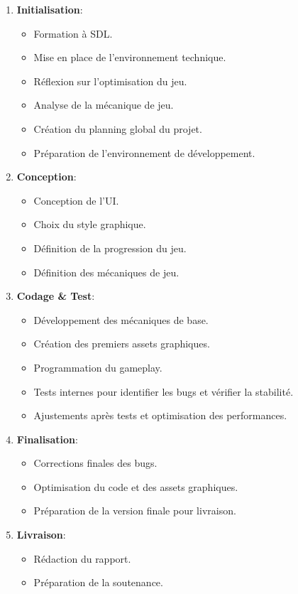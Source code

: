 \documentclass[11pt,a4paper]{article}
\begin{document}
\begin{enumerate}
    \item \textbf{Initialisation}: 
    \begin{itemize}
        \item Formation à SDL.
        \item Mise en place de l'environnement technique.
        \item Réflexion sur l'optimisation du jeu.
        \item Analyse de la mécanique de jeu.
        \item Création du planning global du projet.
        \item Préparation de l’environnement de développement.
    \end{itemize}
    \item \textbf{Conception}: 
    \begin{itemize}
        \item Conception de l'UI.
        \item Choix du style graphique.
        \item Définition de la progression du jeu.
        \item Définition des mécaniques de jeu.
    \end{itemize}
    \item \textbf{Codage \& Test}:
    \begin{itemize}
        \item Développement des mécaniques de base.
        \item Création des premiers assets graphiques.
        \item Programmation du gameplay.
        \item Tests internes pour identifier les bugs et vérifier la stabilité.
        \item Ajustements après tests et optimisation des performances.
    \end{itemize}
    \item \textbf{Finalisation}: 
    \begin{itemize}
        \item Corrections finales des bugs.
        \item Optimisation du code et des assets graphiques.
        \item Préparation de la version finale pour livraison.
    \end{itemize}
    \item \textbf{Livraison}: 
    \begin{itemize}
        \item Rédaction du rapport.
        \item Préparation de la soutenance.
    \end{itemize}
\end{enumerate}
\end{document}
